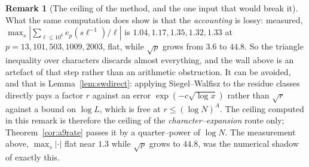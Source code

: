 \documentclass[11pt]{article}
\theoremstyle{definition}
\newtheorem{remark}[theorem]{Remark}
\begin{document}
\begin{remark}[The ceiling of the method, and the one input that would break it]
What the same computation does show is that the \emph{accounting} is lossy: measured,
$\max_s|\sum_{\ell\le10^6}e_p(s\ell^{-1})/\ell|$ is $1.04,1.17,1.35,1.32,1.33$ at
$p=13,101,503,1009,2003$, flat, while $\sqrt p$ grows from $3.6$ to $44.8$. So the triangle
inequality over characters discards almost everything, and the wall above is an artefact of that
step rather than an arithmetic obstruction. It can be avoided, and that is
Lemma~\ref{lem:swdirect}: applying Siegel--Walfisz to the residue classes directly pays a factor $r$
against an error $\exp(-c\sqrt{\log x})$ rather than $\sqrt r$ against a bound on $\log L$, which is
free at $r\le(\log N)^A$. The ceiling computed in this remark is therefore the ceiling of the
\emph{character--expansion} route only; Theorem~\ref{cor:a9rate} passes it by a quarter--power of
$\log N$. The measurement above, $\max_s|\cdot|$ flat near $1.3$ while $\sqrt p$ grows to $44.8$, was the numerical shadow of exactly this.
\end{remark}
\end{document}
